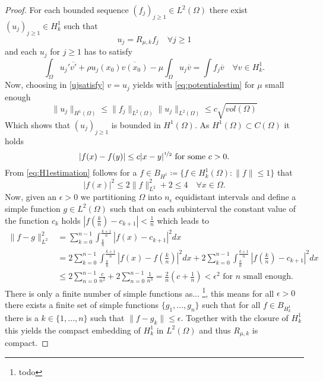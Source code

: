 \begin{theorem}
	\begin{proof}
	For each bounded sequence $(f_{j})_{j \geq 1} \in L^{2}(\Omega)$ there exist $(u_{j})_{j \geq 1} \in H^{1}_{k}$ such that
		\[ u_{j} = R_{\mu, k} f_{j} \quad \forall j \geq 1 \]
	and each $u_{j}$ for $j \geq 1$ has to satisfy
		\begin{equation}
			\int_{\Omega} u_{j}' \overline{v'} + \rho u_{j}(x_{0}) \overline{v(x_{0})} - \mu \int_{\Omega} u_{j} \overline{v} = \int f_{j} \overline{v} \quad \forall v \in H^{1}_{k}. \label{ujsatisfy}
		\end{equation} 
	Now, choosing in \eqref{ujsatisfy} $v = u_{j}$ yields with \eqref{eq:potentialestim} for $\mu$ small enough
		\[  \| u_{j} \|_{H^{1}(\Omega)} \leq \| f_{j} \|_{L^{2}(\Omega)} \| u_{j} \|_{L^{2}(\Omega)} \leq c \sqrt{vol(\Omega)} \]
	Which shows that $(u_{j})_{j \geq 1}$ is bounded in $H^{1}(\Omega)$. As $H^1(\Omega) \subset C(\Omega)$ it holds
		\begin{equation}
			|f(x) - f(y)| \leq c |x - y|^{\nicefrac{1}{2}} \text{ for some } c > 0. \label{eq:H1estimation}
		\end{equation}  
		From \eqref{eq:H1estimation} follows for a $f \in B_{H^{1}} \coloneqq \{ f \in H^{1}_{k}(\Omega) : \| f \| \leq 1 \}$ that 
		\[ |f(x)|^{2} \leq 2 \| f \|^{2}_{L^{2}} + 2 \leq 4 \quad \forall x \in \Omega. \]
		Now, given an $\epsilon > 0$ we partitioning $\Omega$ into $n_{\epsilon}$ equidistant intervals and define a simple function $g \in L^{2}(\Omega)$ such that on each subinterval the constant value of the function $c_{k}$ holds $|f(\frac{k}{n}) - c_{k + 1}| < \frac{1}{n}$ which leads to
		\begin{align*}
			\| f - g \|^{2}_{L^{2}} & = \sum_{k = 0}^{n-1} \int_{\frac{k}{n}}^{\frac{k+1}{n}} | f(x) - c_{k+1} |^{2} dx \\
				& =  2 \sum_{k = 0}^{n-1} \int_{\frac{k}{n}}^{\frac{k+1}{n}} | f(x) - f(\frac{k}{n}) |^{2} dx +  2 \sum_{k = 0}^{n-1} \int_{\frac{k}{n}}^{\frac{k+1}{n}} | f(\frac{k}{n}) - c_{k+1} |^{2} dx \\
				& \leq 2 \sum_{n = 0}^{n-1} \frac{c}{n^{2}} + 2 \sum_{n=0}^{n-1} \frac{1}{n^{3}} = \frac{2}{n} \left( c + \frac{1}{n} \right) < \epsilon^{2} \text{ for } n \text{ small enough.}
		\end{align*}		 
		There is only a finite number of simple functions as... \footnote{todo}, this means for all $\epsilon > 0$ there exists a finite set of simple functions $\{ g_{1}, \dotsc, g_{n} \}$ such that for all $f \in B_{H^{1}_{k}}$ there is a $k \in \{1, \dotsc, n\}$ such that $\| f - g_{k} \| \leq \epsilon$. Together with the closure of $H^{1}_{k}$ this yields the compact embedding of $H^{1}_{k}$ in $L^{2}(\Omega)$ and thus $R_{\mu, k}$ is compact. %
	\end{proof}	
\end{theorem}

